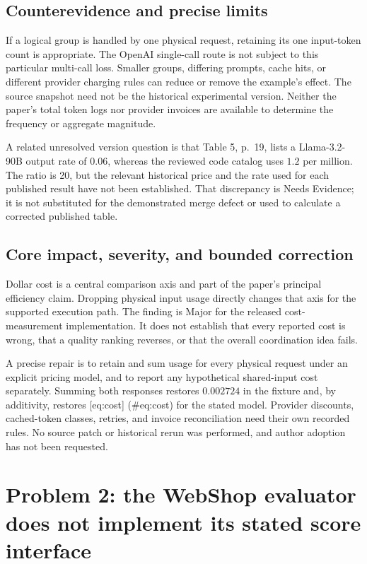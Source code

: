 \documentclass[10pt]{article}
\begin{document}
\subsection*{Counterevidence and precise limits}
If a logical group is handled by one physical request, retaining its one input-token count is appropriate. The OpenAI single-call route is not subject to this particular multi-call loss. Smaller groups, differing prompts, cache hits, or different provider charging rules can reduce or remove the example’s effect. The source snapshot need not be the historical experimental version. Neither the paper’s total token logs nor provider invoices are available to determine the frequency or aggregate magnitude.\par
A related unresolved version question is that Table 5, p. 19, lists a Llama-3.2-90B output rate of \(0.06\), whereas the reviewed code catalog uses \(1.2\) per million. The ratio is 20, but the relevant historical price and the rate used for each published result have not been established. That discrepancy is Needs Evidence; it is not substituted for the demonstrated merge defect or used to calculate a corrected published table.\par
\subsection*{Core impact, severity, and bounded correction}
Dollar cost is a central comparison axis and part of the paper’s principal efficiency claim. Dropping physical input usage directly changes that axis for the supported execution path. The finding is Major for the released cost-measurement implementation. It does not establish that every reported cost is wrong, that a quality ranking reverses, or that the overall coordination idea fails.\par
A precise repair is to retain and sum usage for every physical request under an explicit pricing model, and to report any hypothetical shared-input cost separately. Summing both responses restores \(0.002724\) in the fixture and, by additivity, restores [eq:cost] (\#eq:cost) for the stated model. Provider discounts, cached-token classes, retries, and invoice reconciliation need their own recorded rules. No source patch or historical rerun was performed, and author adoption has not been requested.\par
\section*{Problem 2: the WebShop evaluator does not implement its stated score interface}
\end{document}
